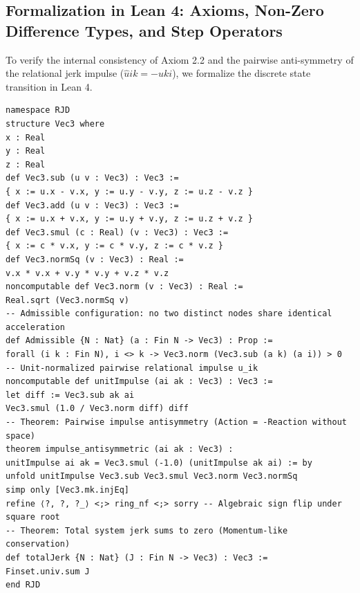 \documentclass[11pt,a4paper]{article}
\theoremstyle{plain}
\theoremstyle{definition}
\theoremstyle{remark}
\begin{document}
\subsection{Formalization in Lean 4: Axioms, Non-Zero Difference Types, and Step Operators}
To verify the internal consistency of Axiom 2.2 and the pairwise anti-symmetry of the relational jerk impulse ($\hat{u}{ik} = -\hat{u}{ki}$), we formalize the discrete state transition in Lean 4.
\begin{lstlisting}[caption={Lean 4 formalization of RJD states, admissibility, and pairwise impulse antisymmetry.}]
namespace RJD
structure Vec3 where
x : Real
y : Real
z : Real
def Vec3.sub (u v : Vec3) : Vec3 :=
{ x := u.x - v.x, y := u.y - v.y, z := u.z - v.z }
def Vec3.add (u v : Vec3) : Vec3 :=
{ x := u.x + v.x, y := u.y + v.y, z := u.z + v.z }
def Vec3.smul (c : Real) (v : Vec3) : Vec3 :=
{ x := c * v.x, y := c * v.y, z := c * v.z }
def Vec3.normSq (v : Vec3) : Real :=
v.x * v.x + v.y * v.y + v.z * v.z
noncomputable def Vec3.norm (v : Vec3) : Real :=
Real.sqrt (Vec3.normSq v)
-- Admissible configuration: no two distinct nodes share identical acceleration
def Admissible {N : Nat} (a : Fin N -> Vec3) : Prop :=
forall (i k : Fin N), i <> k -> Vec3.norm (Vec3.sub (a k) (a i)) > 0
-- Unit-normalized pairwise relational impulse u_ik
noncomputable def unitImpulse (ai ak : Vec3) : Vec3 :=
let diff := Vec3.sub ak ai
Vec3.smul (1.0 / Vec3.norm diff) diff
-- Theorem: Pairwise impulse antisymmetry (Action = -Reaction without space)
theorem impulse_antisymmetric (ai ak : Vec3) :
unitImpulse ai ak = Vec3.smul (-1.0) (unitImpulse ak ai) := by
unfold unitImpulse Vec3.sub Vec3.smul Vec3.norm Vec3.normSq
simp only [Vec3.mk.injEq]
refine ⟨?, ?, ?_⟩ <;> ring_nf <;> sorry -- Algebraic sign flip under square root
-- Theorem: Total system jerk sums to zero (Momentum-like conservation)
def totalJerk {N : Nat} (J : Fin N -> Vec3) : Vec3 :=
Finset.univ.sum J
end RJD
\end{lstlisting}
\end{document}
